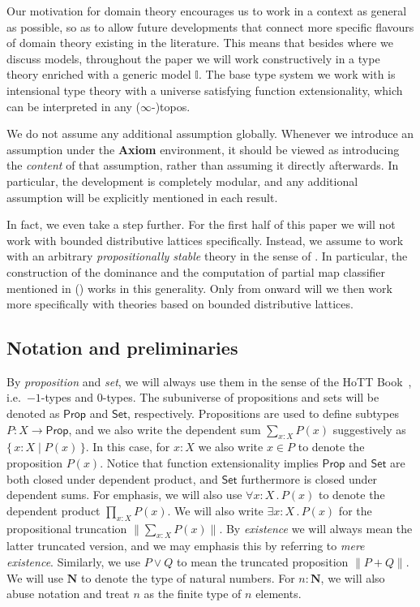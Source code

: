 \documentclass[a4paper,12pt]{amsart}
\theoremstyle{definition}
\newcommand{\mb}[1]{\mathbf{#1}}
\newcommand{\mbb}[1]{\mathbb{#1}}
\newcommand{\I}{\mbb I}
\newcommand{\ms}[1]{\mathsf{#1}}
\newcommand{\scomp}[2]{\{\,#1\mid#2\,\}}
\newcommand{\N}{\mb N}
\newcommand{\fa}[2]{\forall #1\!\colon\!\!#2\mathpunct{.}}
\newcommand{\ex}[2]{\exists #1\!\colon\!\!#2\mathpunct{.}}
\newcommand{\pss}[1]{\lVert #1\rVert} %
\newcommand{\pp}{\ms{Prop}}
\newcommand{\st}{\ms{Set}}
\begin{document}
Our motivation for domain theory encourages us to work in a context as general as possible, so as to allow future developments that connect more specific flavours of domain theory existing in the literature. This means that besides  where we discuss models, throughout the paper we will work constructively in a type theory enriched with a generic model $\I$. The base type system we work with is intensional type theory with a universe satisfying function extensionality, which can be interpreted in any ($\infty$-)topos. 

We do not assume any additional assumption globally. Whenever we introduce an assumption under the \textbf{Axiom} environment, it should be viewed as introducing the \emph{content} of that assumption, rather than assuming it directly afterwards. In particular, the development is completely modular, and any additional assumption will be explicitly mentioned in each result.

In fact, we even take a step further. For the first half of this paper we will not work with bounded distributive lattices specifically. Instead, we assume to work with an arbitrary \emph{propositionally stable} theory in the sense of . In particular, the construction of the dominance and the computation of partial map classifier mentioned in  () works in this generality. Only from  onward will we then work more specifically with theories based on bounded distributive lattices.

\subsection*{Notation and preliminaries}

By \emph{proposition} and \emph{set}, we will always use them in the sense of the HoTT Book~\cite{hottbook}, i.e.\ $-1$-types and $0$-types. The subuniverse of propositions and sets will be denoted as $\pp$ and $\st$, respectively. Propositions are used to define subtypes $P \colon X \to \pp$, and we also write the dependent sum $\sum_{x:X}P(x)$ suggestively as $\scomp{x:X}{P(x)}$. In this case, for $x:X$ we also write $x\in P$ to denote the proposition $P(x)$. Notice that function extensionality implies $\pp$ and $\st$ are both closed under dependent product, and $\st$ furthermore is closed under dependent sums. For emphasis, we will also use $\fa xXP(x)$ to denote the dependent product $\prod_{x:X}P(x)$. We will also write $\ex xXP(x)$ for the propositional truncation $\pss{\sum_{x:X}P(x)}$. By \emph{existence} we will always mean the latter truncated version, and we may emphasis this by referring to \emph{mere existence}. Similarly, we use $P \vee Q$ to mean the truncated proposition $\pss{P + Q}$. We will use $\N$ to denote the type of natural numbers. For $n:\N$, we will also abuse notation and treat $n$ as the finite type of $n$ elements. 
\end{document}
